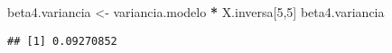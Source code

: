 \documentclass[
]{article}
\newenvironment{Shaded}{\begin{snugshade}}{\end{snugshade}}
\newcommand{\DecValTok}[1]{\textcolor[rgb]{0.00,0.00,0.81}{#1}}
\newcommand{\NormalTok}[1]{#1}
\newcommand{\OperatorTok}[1]{\textcolor[rgb]{0.81,0.36,0.00}{\textbf{#1}}}
\newcommand{\StringTok}[1]{\textcolor[rgb]{0.31,0.60,0.02}{#1}}
\begin{document}
\begin{Shaded}
\begin{Highlighting}[]
\NormalTok{beta4.variancia <-}\StringTok{ }\NormalTok{variancia.modelo }\OperatorTok{*}\StringTok{ }\NormalTok{X.inversa[}\DecValTok{5}\NormalTok{,}\DecValTok{5}\NormalTok{]}
\NormalTok{beta4.variancia}
\end{Highlighting}
\end{Shaded}

\begin{verbatim}
## [1] 0.09270852
\end{verbatim}
\end{document}
